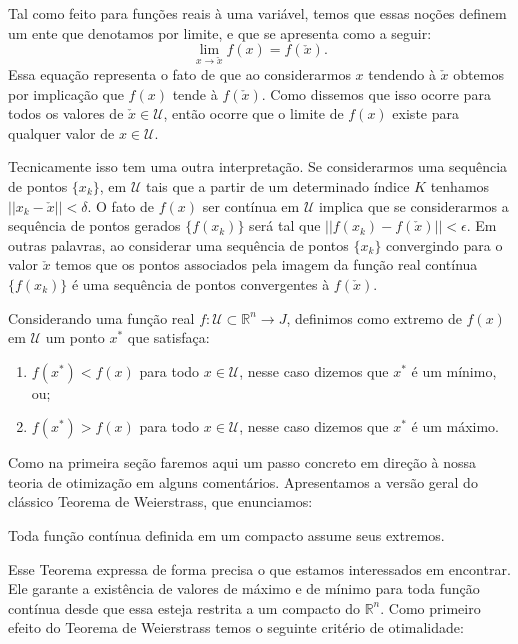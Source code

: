 \par Tal como feito para funções reais à uma variável, temos que essas noções definem um ente que denotamos por limite, e que se apresenta como a seguir:
$$\lim_{x \rightarrow \check{x}}f(x)= f(\check{x}).$$
Essa equação representa o fato de que ao considerarmos $x$ tendendo à $\check{x}$ obtemos por implicação que $f(x)$ tende à $f(\check{x})$. Como dissemos que isso ocorre para todos os valores de $\check{x} \in \mathcal{U}$, então ocorre que o limite de $f(x)$ existe para qualquer valor de $x \in \mathcal{U}$.

\par  Tecnicamente isso tem uma outra interpretação. Se considerarmos uma sequência de pontos $\{x_k\}$, em $\mathcal{U}$ tais que a partir de um determinado índice $K$ tenhamos $||x_k - \check{x}|| < \delta$. O fato de $f(x)$ ser contínua em $\mathcal{U}$ implica que se considerarmos a sequência de pontos gerados $\{f(x_k)\}$ será tal que $||f(x_k) - f(\check{x})|| < \epsilon$. Em outras palavras, ao considerar uma sequência de pontos $\{x_k\}$ convergindo para o valor $\check{x}$ temos que os pontos associados pela imagem da função real contínua $\{f(x_k)\}$ é uma sequência de pontos convergentes à $f(\check{x})$.

\begin{definition}[Extremos de $f(x)$]
  Considerando uma função real $f : \mathcal{U} \subset \mathbb{R}^n \rightarrow J$, definimos como extremo de $f(x)$ em $\mathcal{U}$ um ponto $x^*$ que satisfaça:
  \begin{enumerate}
  \item $f(x^*) < f(x)$ para todo $x \in \mathcal{U}$, nesse caso dizemos que $x^*$ é um mínimo, ou;
  \item $f(x^*) > f(x)$ para todo $x \in \mathcal{U}$, nesse caso dizemos que $x^*$ é um máximo.
  \end{enumerate}
\end{definition}


\par Como na primeira seção faremos aqui um passo concreto em direção à nossa teoria de otimização em alguns comentários.  Apresentamos a versão geral do clássico Teorema de Weierstrass, que enunciamos:

\begin{theorem}
  Toda função contínua definida em um compacto assume seus extremos.
\end{theorem}

\par Esse Teorema expressa de forma precisa o que estamos interessados em encontrar. Ele garante a existência de valores de máximo e de mínimo para toda função contínua desde que essa esteja restrita a um compacto do $\mathbb{R}^n$. Como primeiro efeito do Teorema de Weierstrass temos o seguinte critério de otimalidade:

